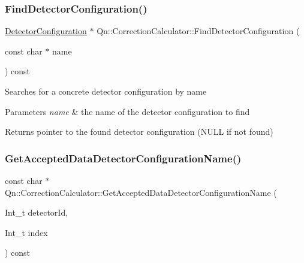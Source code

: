\subsubsection{\texorpdfstring{Find\+Detector\+Configuration()}{FindDetectorConfiguration()}}
{\footnotesize\ttfamily \mbox{\hyperlink{classQn_1_1DetectorConfiguration}{Detector\+Configuration}} $\ast$ Qn\+::\+Correction\+Calculator\+::\+Find\+Detector\+Configuration (\begin{DoxyParamCaption}\item[{const char $\ast$}]{name }\end{DoxyParamCaption}) const}

Searches for a concrete detector configuration by name 
\begin{DoxyParams}{Parameters}
{\em name} & the name of the detector configuration to find \\
\hline
\end{DoxyParams}
\begin{DoxyReturn}{Returns}
pointer to the found detector configuration (N\+U\+LL if not found) 
\end{DoxyReturn}
\mbox{\label{classQn_1_1CorrectionCalculator_a616c96ae201975106427677203bfd3c8}} 
\subsubsection{\texorpdfstring{Get\+Accepted\+Data\+Detector\+Configuration\+Name()}{GetAcceptedDataDetectorConfigurationName()}}
{\footnotesize\ttfamily const char $\ast$ Qn\+::\+Correction\+Calculator\+::\+Get\+Accepted\+Data\+Detector\+Configuration\+Name (\begin{DoxyParamCaption}\item[{Int\+\_\+t}]{detector\+Id,  }\item[{Int\+\_\+t}]{index }\end{DoxyParamCaption}) const\hspace{0.3cm}{\ttfamily [inline]}}

